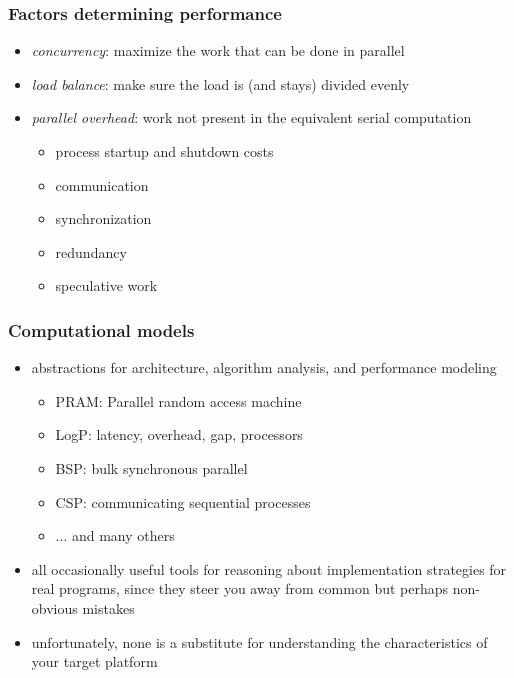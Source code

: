 \begin{frame}[fragile]
%
  \frametitle{Factors determining performance}
%
  \begin{itemize}
%
  \item {\em concurrency}: maximize the work that can be done in parallel
  \item {\em load balance}: make sure the load is (and stays) divided evenly
  \item {\em parallel overhead}: work not present in the equivalent serial computation
    \begin{itemize}
      \item process startup and shutdown costs
      \item communication
      \item synchronization
      \item redundancy
      \item speculative work
    \end{itemize}
%
  \end{itemize}
%
\end{frame}

\begin{frame}[fragile]
%
  \frametitle{Computational models}
%
  \begin{itemize}
%
    \item abstractions for architecture, algorithm analysis, and performance modeling
      \begin{itemize}
      \item PRAM: Parallel random access machine
      \item LogP: latency, overhead, gap, processors
      \item BSP: bulk synchronous parallel
      \item CSP: communicating sequential processes
      \item ... and many others
      \end{itemize}
%
    \item all occasionally useful tools for reasoning about implementation strategies for real
      programs, since they steer you away from common but perhaps non-obvious mistakes
    \item unfortunately, none is a substitute for understanding the characteristics of your
      target platform
%
  \end{itemize}
%
\end{frame}

